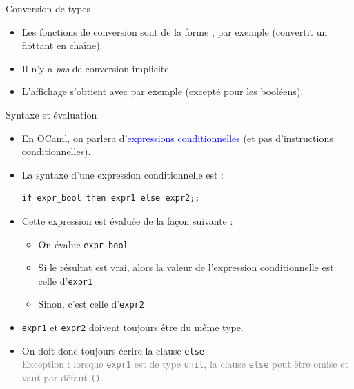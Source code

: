 \documentclass[10pt]{beamer}
\begin{document}
\begin{frame}{\Ctitle}{\stitle}
\begin{block}{Conversion de types}
\begin{center}
		\end{center}
		\begin{itemize}
			\item<7-> Les fonctions de conversion sont de la forme , par exemple  (convertit un flottant en chaîne).
			\item<8-> Il n'y a \textit{pas} de conversion implicite.
			\item<9-> L'affichage s'obtient avec  par exemple  (excepté pour les booléens).
		\end{itemize}
	\end{block}
\end{frame}

\begin{frame}[fragile]{\Ctitle}{\stitle}
	\begin{block}{Syntaxe et évaluation}
		\begin{itemize}
		\item<1-> En OCaml, on parlera d'\textcolor{blue}{expressions conditionnelles} (et pas d'instructions conditionnelles).
		\item<2-> La syntaxe d'une expression conditionnelle est :
		\begin{verbatim}
if expr_bool then expr1 else expr2;;
		\end{verbatim}
		\item<3-> Cette expression est évaluée de la façon suivante :
		\begin{itemize}
			\item<4-> On évalue {\tt expr\_bool}
			\item<5-> Si le résultat est vrai, alors la valeur de l'expression conditionnelle est celle d'{\tt expr1}
			\item<6-> Sinon, c'est celle d'{\tt expr2}
		\end{itemize}
		\item<7-> {\tt expr1} et {\tt expr2} doivent toujours être du même type.
		\item<8-> On doit donc toujours écrire la clause {\tt else} \\
		\onslide<9->\textcolor{gray}{\small Exception : lorsque {\tt expr1} est de type {\tt unit}, la clause {\tt else} peut être omise et vaut par défaut {\tt ()}.}
	\end{itemize}
	\end{block}
\end{frame}
\end{document}
